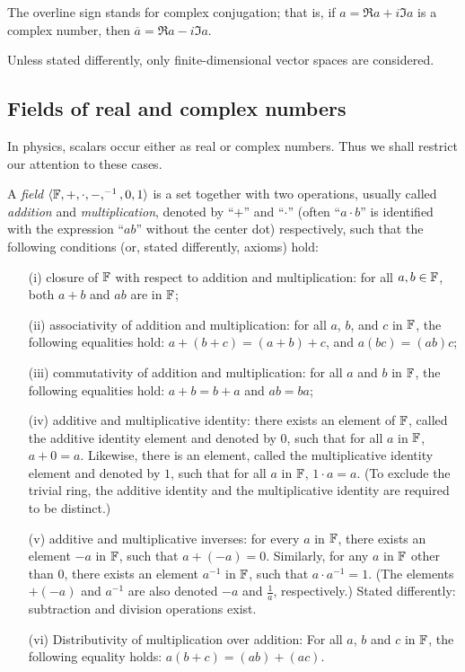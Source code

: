 The overline sign stands for complex conjugation; that is,
if
${a}= \Re a +i\Im a $ is a complex number, then
$\overline{a}= \Re a -i\Im a$.

Unless stated differently, only
finite-dimensional vector spaces are considered.

\subsection{Fields of real and complex numbers}

In physics, scalars occur either as real or complex numbers.
Thus we shall restrict our attention to these cases.

A {\em field}  $\langle  {\Bbb F} , +, \cdot , -, ^{-1}, 0, 1\rangle$
is a set together with two operations,
usually called {\em addition} and {\em multiplication},   denoted by ``$+$'' and ``$\cdot$''
(often  ``$a\cdot b$'' is identified with the expression ``$ab$'' without the center dot)
respectively, such that the following conditions (or, stated differently, axioms) hold:
\begin{itemize}
\item[(i)]
closure of ${\Bbb F}$ with respect to addition and multiplication:
for all $a, b \in {\Bbb F}$, both $a + b$ and $a   b$ are in ${\Bbb F}$;
\item[(ii)]
associativity of addition and multiplication:
for all $a$, $b$, and $c$ in ${\Bbb F}$,
the following equalities hold: $a + (b + c) = (a + b) + c$,
and
$a (b c) = (a  b) c$;
\item[(iii)]
commutativity of addition and multiplication:
for all $a$ and $b$ in ${\Bbb F}$, the following equalities hold: $a + b = b + a$ and $a b = b  a$;
\item[(iv)]
additive and multiplicative identity:
there exists an element of ${\Bbb F}$,
called the additive identity element and denoted by $0$, such that for all $a$ in ${\Bbb F}$,
$a + 0 = a$.
Likewise, there is an element, called the multiplicative identity element and denoted by $1$,
such that for all $a$ in ${\Bbb F}$, $1 \cdot a  = a$.
(To exclude the trivial ring, the additive identity and the multiplicative
identity are required to be distinct.)
\item[(v)]
additive and multiplicative inverses:
for every $a$ in ${\Bbb F}$, there exists an element $-a$ in ${\Bbb F}$, such that $a + (-a) = 0$.
Similarly, for any $a$ in ${\Bbb F}$ other than $0$, there exists an element $a^{-1}$ in ${\Bbb F}$,
such that $a \cdot a^{-1} = 1$.
(The elements $+ (-a)$ and  $a^{-1}$
are also denoted $-a$ and $\frac{1}{a}$, respectively.)
Stated differently: subtraction and division operations exist.
\item[(vi)]
Distributivity of multiplication over addition:
For all $a$, $b$ and $c$ in ${\Bbb F}$, the following equality holds:
$a (b + c) = (a  b) + (a  c)$.
\end{itemize}

